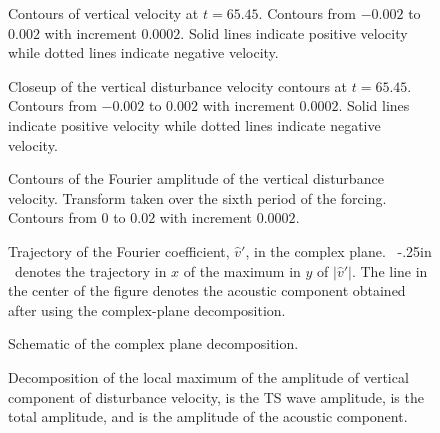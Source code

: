 %
\begin{figure}[p]
\centering
\epsfxsize=6.0in 
\caption [Contours of vertical velocity at $t=65.45$.]{Contours of vertical
velocity at $t=65.45$. Contours from $-0.002$ to $0.002$ with increment
$0.0002$.  Solid lines indicate positive velocity while dotted lines indicate
negative velocity. \label{vprime} }
\end{figure}
%
\begin{figure}[p]
\centering
\epsfxsize=5.5in 
\caption [Closeup of the vertical disturbance velocity contours at
$t=65.45$.]{Closeup of the vertical disturbance velocity contours at
$t=65.45$.  Contours from $-0.002$ to $0.002$ with increment $0.0002$.  Solid
lines indicate positive velocity while dotted lines indicate negative
velocity.  \label{vclose}}
\end{figure}
%
\begin{figure}[p]
\centering
\epsfxsize=5.5in 
\caption [Contours of the Fourier amplitude of the vertical disturbance
velocity.]{Contours of the Fourier amplitude of the vertical disturbance
velocity.  Transform taken over the sixth period of the forcing.  Contours
from $0$ to $0.02$ with increment $0.0002$. \label{vamp}}
\end{figure}
%
%
\begin{figure}[p]
\centering
{}
\epsfxsize=4.0in 
\caption [Trajectory of the Fourier coefficient, $\hat v'$]{Trajectory of the
Fourier coefficient, $\hat v'$, in the complex plane.  \hbox{\solid\kern
-.25in\solidcircle} ~denotes the trajectory in $x$ of the maximum in $y$ of
$|\hat v'|$.  The \solid line in the center of the figure denotes the acoustic
component obtained after using the complex-plane
decomposition. \label{vmax_phase}}
\end{figure}
%
\begin{figure}[p]
\centering
\epsfxsize=3.0in 
\caption [Schematic of the complex-plane decomposition]{Schematic of the
complex plane decomposition. \label{cpd_schematic}}
\end{figure}
%
\begin{figure}[p]
\centering
{}
\epsfxsize=5.25in 
\caption [Decomposition of the local maximum of the disturbance
amplitude]{Decomposition of the local maximum of the amplitude of vertical
component of disturbance velocity, \solid is the TS wave amplitude,
\dashed is the total amplitude, and \dotted is the amplitude of the
acoustic component. \label{vmax_corr}}
\end{figure}
